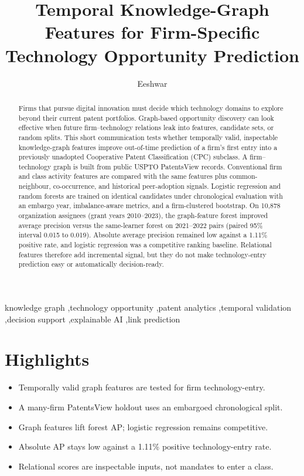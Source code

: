 \documentclass[preprint,12pt,3p]{elsarticle}
\begin{document}
\begin{frontmatter}

\title{Temporal Knowledge-Graph Features for Firm-Specific Technology Opportunity Prediction}

\author{Eeshwar}

\begin{abstract}
Firms that pursue digital innovation must decide which technology domains to explore beyond their current patent portfolios. Graph-based opportunity discovery can look effective when future firm--technology relations leak into features, candidate sets, or random splits. This short communication tests whether temporally valid, inspectable knowledge-graph features improve out-of-time prediction of a firm's first entry into a previously unadopted Cooperative Patent Classification (CPC) subclass. A firm--technology graph is built from public USPTO PatentsView records. Conventional firm and class activity features are compared with the same features plus common-neighbour, co-occurrence, and historical peer-adoption signals. Logistic regression and random forests are trained on identical candidates under chronological evaluation with an embargo year, imbalance-aware metrics, and a firm-clustered bootstrap. On 10{,}878 organization assignees (grant years 2010--2023), the graph-feature forest improved average precision versus the same-learner forest on 2021--2022 pairs (paired 95\% interval 0.015 to 0.019). Absolute average precision remained low against a 1.11\% positive rate, and logistic regression was a competitive ranking baseline. Relational features therefore add incremental signal, but they do not make technology-entry prediction easy or automatically decision-ready.
\end{abstract}

\begin{keyword}
knowledge graph \sep technology opportunity \sep patent analytics \sep temporal validation \sep decision support \sep explainable AI \sep link prediction
\end{keyword}

\end{frontmatter}

\section*{Highlights}
\begin{itemize}
\item Temporally valid graph features are tested for firm technology-entry.
\item A many-firm PatentsView holdout uses an embargoed chronological split.
\item Graph features lift forest AP; logistic regression remains competitive.
\item Absolute AP stays low against a 1.11\% positive technology-entry rate.
\item Relational scores are inspectable inputs, not mandates to enter a class.
\end{itemize}
\end{document}
